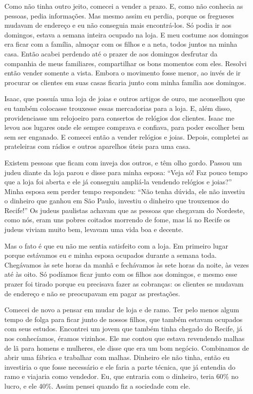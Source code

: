 Como não tinha outro jeito, comecei a vender a prazo. E, como não conhecia as pessoas, pedia
informações. Mas mesmo assim eu perdia, porque os fregueses mudavam de
endereço e eu não conseguia mais encontrá-los. Só podia ir aos domingos, estava a semana inteira ocupado na loja. E meu costume aos
domingos era ficar com a família, almoçar com os filhos e a neta, todos
juntos na minha casa. Então acabei perdendo até o prazer de aos domingos desfrutar da companhia de meus familiares,
compartilhar os bons momentos com eles. Resolvi então vender somente a
vista. Embora o movimento fosse menor, ao invés de ir procurar os clientes
em suas casas ficaria junto com minha família aos domingos.

Isaac, que possuía uma loja de joias e
outros artigos de ouro, me aconselhou que eu também colocasse trouxesse essas mercadorias para a 
loja. E, além disso, providenciasse um relojoeiro para
consertos de relógios dos clientes. Isaac
me levou aos lugares onde ele sempre comprava e confiava, para poder escolher
bem sem ser enganado. E comecei então a vender relógios e joias. Depois, completei as prateleiras com rádios e outros aparelhos úteis para uma casa.

Existem pessoas que ficam com inveja dos outros, e têm olho gordo. Passou
um judeu diante da loja parou e disse para minha esposa: ``Veja
só! Faz pouco tempo que a loja foi aberta e ele já conseguiu ampliá-la
vendendo relógios e joias?'' Minha esposa sem perder tempo respondeu:
``Não tenha dúvida, ele não investiu o dinheiro que ganhou em São Paulo,
investiu o dinheiro que trouxemos do Recife!'' Os judeus paulistas achavam que as pessoas que chegavam do Nordeste,
como nós, eram uns pobres coitados morrendo de fome, mas lá no Recife os
judeus viviam muito bem, levavam uma vida boa e decente.

Mas o fato é que eu não me sentia satisfeito com a loja. Em primeiro lugar
porque estávamos eu e minha esposa ocupados durante a semana toda. Chegávamos às 
sete horas da manhã e fechávamos às sete horas da noite,
às vezes até às oito. Só podíamos ficar junto com os filhos aos
domingos, e mesmo esse prazer foi tirado porque eu precisava
fazer as cobranças: os clientes se mudavam de endereço e
não se preocupavam em pagar as prestações.

Comecei de novo a pensar em mudar de loja e de ramo. Ter pelo menos
algum tempo de folga para ficar junto de nossos filhos, que também
estavam ocupados com seus estudos. Encontrei um jovem que também tinha
chegado do Recife, já nos conhecíamos, éramos vizinhos. Ele me contou
que estava revendendo malhas de lã para
homens e mulheres, ele disse que era um bom negócio.
Combinamos de abrir uma fábrica e trabalhar com malhas. Dinheiro ele
não tinha, então eu investiria o que fosse necessário e ele faria a parte
técnica, que já entendia do ramo e viajaria como vendedor. Eu, que entraria com o dinheiro,
teria 60\% no lucro, e ele 40\%. Assim pensei quando fiz a
sociedade com ele.

